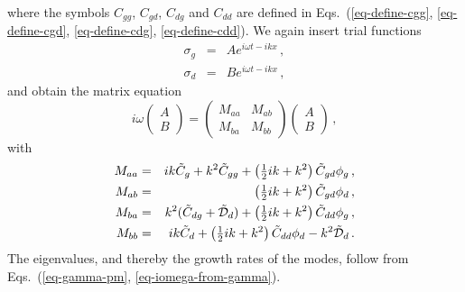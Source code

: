 \documentclass{aa}
\def\comma{\,,}
\def\fullstop{\,.}
\begin{document}
where the symbols $C_{gg}$, $C_{gd}$, $C_{dg}$ and $C_{dd}$ are defined
in Eqs.~(\ref{eq-define-cgg}, \ref{eq-define-cgd}, \ref{eq-define-cdg},
\ref{eq-define-cdd}). We again insert trial functions
\begin{eqnarray}
\sigma_g &=& A e^{i\omega t-ikx}\comma\\
\sigma_d &=& B e^{i\omega t-ikx}\comma
\end{eqnarray}
and obtain the matrix equation
\begin{equation}
i\omega \left(\begin{matrix}
  A\\
  B
\end{matrix}\right)
=\left(\begin{matrix}
  M_{aa} & M_{ab}\\
  M_{ba} & M_{bb}
\end{matrix}\right)
\left(\begin{matrix}
  A\\
  B
\end{matrix}\right)\comma
\end{equation}
with
\begin{eqnarray}
  M_{aa} &=& ik\tilde C_g+k^2\tilde C_{gg} + \left(\tfrac{1}{2}ik+k^2\right)\tilde C_{gd}\phi_g\comma\\
  M_{ab} &=& \left(\tfrac{1}{2}ik+k^2\right)\tilde C_{gd}\phi_d \comma\\
  M_{ba} &=& k^2(\tilde C_{dg}+\tilde {\cal D}_d) + \left(\tfrac{1}{2}ik+k^2\right)\tilde C_{dd}\phi_g \comma\\
  M_{bb} &=& ik\tilde C_d+ \left(\tfrac{1}{2}ik+k^2\right)\tilde C_{dd}\phi_d 
  -k^2\tilde{\cal D}_d\fullstop
\end{eqnarray}
The eigenvalues, and thereby the growth rates of the modes, follow 
from Eqs.~(\ref{eq-gamma-pm}, \ref{eq-iomega-from-gamma}).
\end{document}
